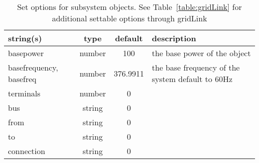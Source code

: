 \begin{table}[ht]
\centering
\begin{tabular}{p{5cm} c c p{7cm}}
\hline
string(s) & type & default & description \\
\hline
basepower & number & 100 & the base power of the object\\
basefrequency, basefreq & number & 376.9911 & the base frequency of the system default to 60Hz\\
terminals & number & 0 & \\
bus & string & 0 & \\
from & string & 0 & \\
to & string & 0 & \\
connection & string & 0 & \\
\hline
\end{tabular}
\caption{Set options for subsystem objects. See Table~\ref{table:gridLink} for additional settable options through gridLink}
\label{table:subsystem}
\end{table}

